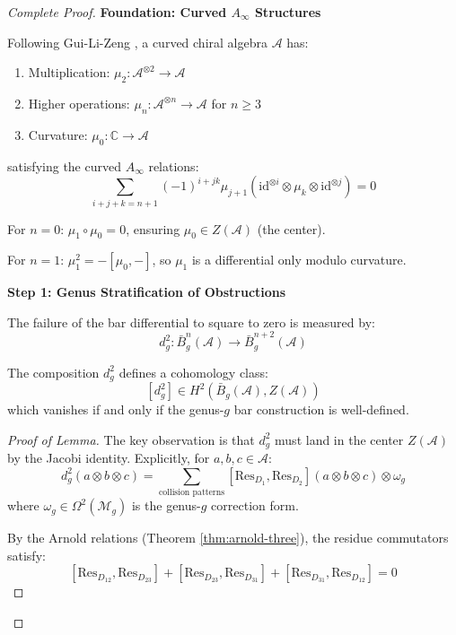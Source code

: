 \begin{proof}[Complete Proof]

\textbf{Foundation: Curved $A_\infty$ Structures}

Following Gui-Li-Zeng \cite{GLZ22}, a curved chiral algebra $\mathcal{A}$ has:
\begin{enumerate}
\item Multiplication: $\mu_2: \mathcal{A}^{\otimes 2} \to \mathcal{A}$
\item Higher operations: $\mu_n: \mathcal{A}^{\otimes n} \to \mathcal{A}$ for $n \geq 3$
\item Curvature: $\mu_0: \mathbb{C} \to \mathcal{A}$
\end{enumerate}
satisfying the curved $A_\infty$ relations:
$$\sum_{i+j+k=n+1} (-1)^{i+jk} \mu_{j+1}(\text{id}^{\otimes i} \otimes \mu_k \otimes 
\text{id}^{\otimes j}) = 0$$

For $n=0$: $\mu_1 \circ \mu_0 = 0$, ensuring $\mu_0 \in Z(\mathcal{A})$ (the center).

For $n=1$: $\mu_1^2 = -[\mu_0, -]$, so $\mu_1$ is a differential only modulo curvature.

\textbf{Step 1: Genus Stratification of Obstructions}

The failure of the bar differential to square to zero is measured by:
$$d_g^2: \bar{B}^n_g(\mathcal{A}) \to \bar{B}^{n+2}_g(\mathcal{A})$$

\begin{lemma}\label{lem:obstruction-class}
The composition $d_g^2$ defines a cohomology class:
$$[d_g^2] \in H^2(\bar{B}_g(\mathcal{A}), Z(\mathcal{A}))$$
which vanishes if and only if the genus-$g$ bar construction is well-defined.
\end{lemma}

\begin{proof}[Proof of Lemma]
The key observation is that $d_g^2$ must land in the center $Z(\mathcal{A})$ by 
the Jacobi identity. Explicitly, for $a, b, c \in \mathcal{A}$:
$$d_g^2(a \otimes b \otimes c) = \sum_{\text{collision patterns}} 
[\text{Res}_{D_1}, \text{Res}_{D_2}](a \otimes b \otimes c) \otimes \omega_g$$
where $\omega_g \in \Omega^2(\mathcal{M}_g)$ is the genus-$g$ correction form.

By the Arnold relations (Theorem \ref{thm:arnold-three}), the residue commutators satisfy:
$$[\text{Res}_{D_{12}}, \text{Res}_{D_{23}}] + [\text{Res}_{D_{23}}, \text{Res}_{D_{31}}] 
+ [\text{Res}_{D_{31}}, \text{Res}_{D_{12}}] = 0$$


\end{proof}
\end{proof}
